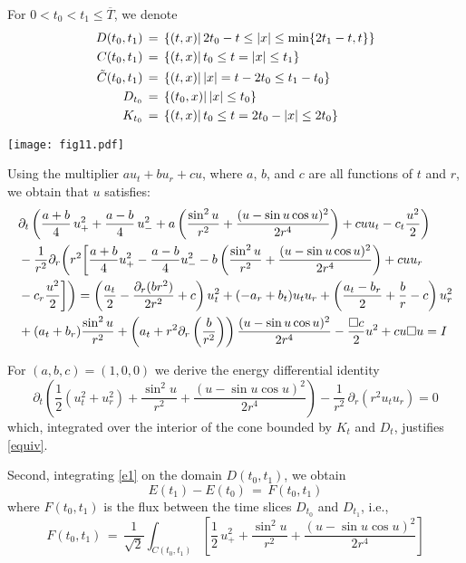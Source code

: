 \documentclass{amsart}
\begin{document}
For $0<t_0<t_1\leq \overline{T}$, we denote
\[
\aligned D(t_0,t_1)\,&=\,\{(t,x)|\, 2t_0-t \leq
|x| \leq \min\{2t_1-t,t\}\}\\
C(t_0,t_1)\,&=\,\{(t,x)|\, t_0 \leq
t=|x| \leq t_1\}\\
\tilde{C}(t_0,t_1)\,&=\,\{(t,x)|\, |x|=t-2t_0 \leq
t_1-t_0\}\\
D_{t_0}\,&=\,\{(t_0,x)|\,
|x| \leq t_0\}\\
K_{t_0}\,&=\,\{(t,x)|\,  t_0 \leq t=2t_0-|x| \leq 2t_0\}
\endaligned
\]

\begin{center}
\texttt{[image: fig11.pdf]}
\end{center}

Using the multiplier $a u_t + b u_r + c u$, where
$a$, $b$, and $c$ are all functions of $t$ and $r$, we obtain that $u$ satisfies:
\begin{equation}
\aligned &\partial_t\left( \frac{a+b}{4}\, u_{+}^2+
\frac{a-b}{4}\, u_{-}^2 + a\left(\frac{\sin^2u}{r^2}+\frac{(u-\sin
u \cos u)^2}{2r^4}\right) + cu u_t
-c_t\frac{u^2}{2}\right)\\
&-\frac{1}{r^2}\partial_r \bigg(r^2 \bigg[\frac{a+b}{4} u_{+}^2- \frac{a-b}{4}
u_{-}^2 - b\left(\frac{\sin^2u}{r^2}+\frac{(u-\sin u \cos
u)^2}{2r^4}\right) + cu u_r\\
&-c_r\frac{u^2}{2}\bigg]\bigg) = \left(\frac{a_t}{2}-\frac{\partial_r(br^2)}{2r^2} +
c\right) u_{t}^2+ (-a_r+b_t) u_t u_r +
\left(\frac{a_t-b_r}{2}+\frac{b}{r} - c\right) u_{r}^2 \\
& +(a_t + b_r)\frac{\sin^2u}{r^2}+\left(a_t +
r^2\partial_r\left(\frac{b}{r^2}\right)\right)\frac{(u-\sin u \cos
u)^2}{2r^4} - \frac{\Box c}{2}u^2 + c u \Box u= I
\endaligned \label{abc}
\end{equation}

For $(a,b,c)=(1,0,0)$ we derive the energy differential identity
\begin{equation}
\partial_t\left(\frac{1}{2}(u_t^2+u_r^2)+\frac{\sin^2u}{r^2}+\frac{(u-\sin
u \cos u)^2}{2r^4}\right)-\frac{1}{r^2}\,\partial_r(r^2u_tu_r)=0 \label{e1}
\end{equation}
which, integrated over the interior of the cone bounded by $K_t$ and $D_t$, justifies \eqref{equiv}.

Second, integrating \eqref{e1} on the domain $D(t_0,t_1)$, we obtain
\begin{equation}
E(t_1)-E(t_0)\,=\,F(t_0,t_1) \label{e}
\end{equation}
where $F(t_0,t_1)$ is the flux between the time slices $D_{t_0}$ and $D_{t_1}$, i.e.,
\[
F(t_0,t_1)\,=\,\frac{1}{\sqrt 2}\int_{C(t_0,t_1)}
\left[\frac{1}{2}\,u_+^2+\frac{\sin^2u}{r^2}+\frac{(u-\sin u \cos
u)^2}{2r^4}\right]
\]
\end{document}
